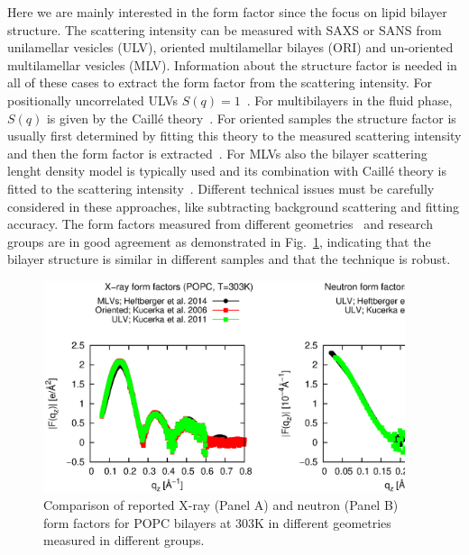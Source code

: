 \documentclass[aps,prl,superscriptaddress,twocolumn]{revtex4}
\begin{document}
Here we are mainly interested in the form factor since the focus on lipid bilayer structure.
The scattering intensity can be measured with SAXS or SANS from unilamellar vesicles (ULV), 
oriented multilamellar bilayes (ORI) and un-oriented multilamellar vesicles (MLV).
Information about the structure factor is needed in all of these cases to extract the 
form factor from the scattering intensity. For positionally uncorrelated ULVs $S(q)=1$~\cite{marquardt15}. 
For multibilayers in the fluid phase, $S(q)$ is given by the Caill\'{e} theory~\cite{Zhang.1994,Lyatskaya.2001}.
For oriented samples the structure factor is usually first determined by fitting this theory to the 
measured scattering intensity and then the form factor is extracted~\cite{kucerka05}.
For MLVs also the bilayer scattering lenght density model is typically used and its combination with 
Caill\'{e} theory is fitted to the scattering intensity~\cite{Heftberger.2014}. 
Different technical issues must be carefully considered in these approaches, like 
subtracting background scattering and fitting accuracy. The form factors measured 
from different geometries~\cite{kucerka05,kucerka07} and research groups are in good agreement
as demonstrated in Fig.~\ref{FFs}, indicating that the bilayer structure is similar in different samples
and that the technique is robust.
\begin{figure}[]
	\includegraphics[width=10.6cm]{../Fig/FFs.eps}
	\caption{\label{FFs}
		Comparison of reported X-ray (Panel A) and neutron (Panel B) form factors for POPC bilayers at 303K in different geometries
                measured in different groups.
	} 
\end{figure}
\end{document}
